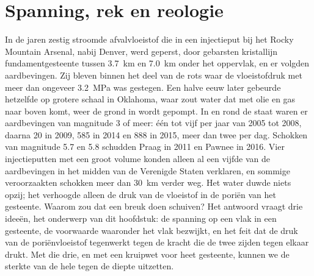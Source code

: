 \chapter{Spanning, rek en reologie}\label{ch:b1:stress-strain-rheology}

In de jaren zestig stroomde afvalvloeistof die in een injectieput bij het Rocky Mountain Arsenal, nabij Denver, werd geperst, door gebarsten kristallijn fundamentgesteente tussen \qty{3.7}{km} en \qty{7.0}{km} onder het oppervlak, en er volgden aardbevingen. Zij bleven binnen het deel van de rots waar de vloeistofdruk met meer dan ongeveer \qty{3.2}{MPa} was gestegen.
Een halve eeuw later gebeurde hetzelfde op grotere schaal in Oklahoma, waar zout water dat met olie en gas naar boven komt, weer de grond in wordt gepompt. In en rond de staat waren er aardbevingen van magnitude 3 of meer: één tot vijf per jaar van 2005 tot 2008, daarna \num{20} in 2009, \num{585} in 2014 en \num{888} in 2015, meer dan twee per dag. Schokken van magnitude 5.7 en 5.8 schudden Praag in 2011 en Pawnee in 2016. Vier injectieputten met een groot volume konden alleen al een vijfde van de aardbevingen in het midden van de Verenigde Staten verklaren, en sommige veroorzaakten schokken meer dan \qty{30}{km} verder weg.
Het water duwde niets opzij; het verhoogde alleen de druk van de vloeistof in de poriën van het gesteente. Waarom zou dat een breuk doen schuiven? Het antwoord vraagt drie ideeën, het onderwerp van dit hoofdstuk: de spanning op een vlak in een gesteente, de voorwaarde waaronder het vlak bezwijkt, en het feit dat de druk van de poriënvloeistof tegenwerkt tegen de kracht die de twee zijden tegen elkaar drukt. Met die drie, en met een kruipwet voor heet gesteente, kunnen we de sterkte van de hele  tegen de diepte uitzetten.


